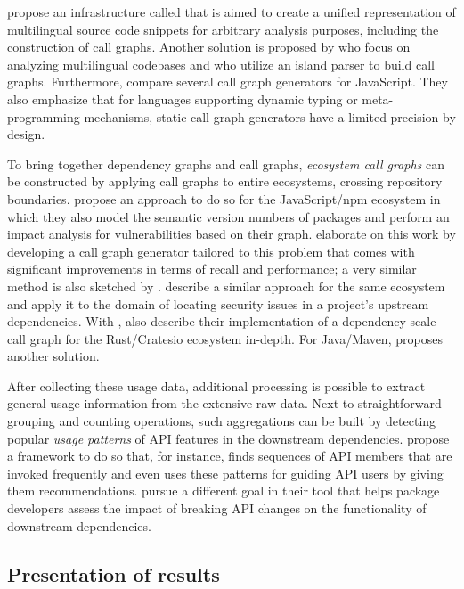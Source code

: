 \citet{collard2013srcml} propose an infrastructure called  that is aimed to create a unified representation of multilingual source code snippets for arbitrary analysis purposes, including the construction of call graphs.
Another solution is proposed by \citet{bogar2018lightweight} who focus on analyzing multilingual codebases and who utilize an island parser to build call graphs.
Furthermore, \citet{antal2018static} compare several call graph generators for JavaScript.
They also emphasize that for languages supporting dynamic typing or meta-programming mechanisms, static call graph generators have a limited precision by design.

To bring together dependency graphs and call graphs, \emph{ecosystem call graphs} can be constructed by applying call graphs to entire ecosystems, crossing repository boundaries.
\citet{hejderup2018software} propose an approach to do so for the JavaScript/npm ecosystem in which they also model the semantic version numbers of packages and perform an impact analysis for vulnerabilities based on their graph.
\citet{nielsen2021modular} elaborate on this work by developing a call graph generator tailored to this problem that comes with significant improvements in terms of recall and performance; a very similar method is also sketched by \citet{boldi2020fine}.
\citet{wang2020empirical} describe a similar approach for the same ecosystem and apply it to the domain of locating security issues in a project's upstream dependencies.
With , \citet{hejderup2021präzi} also describe their implementation of a dependency-scale call graph for the Rust/Cratesio ecosystem in-depth.
For Java/Maven, \citet{keshani2021scalable} proposes another solution.

After collecting these usage data, additional processing is possible to extract general usage information from the extensive raw data.
Next to straightforward grouping and counting operations, such aggregations can be built by detecting popular \emph{usage patterns} of API features in the downstream dependencies.
\citet{zhong2009mapo} propose a framework to do so that, for instance, finds sequences of API members that are invoked frequently and even uses these patterns for guiding API users by giving them recommendations.
\citet{hanam2019aiding} pursue a different goal in their tool that helps package developers assess the impact of breaking API changes on the functionality of downstream dependencies.

\subsection{Presentation of results}

